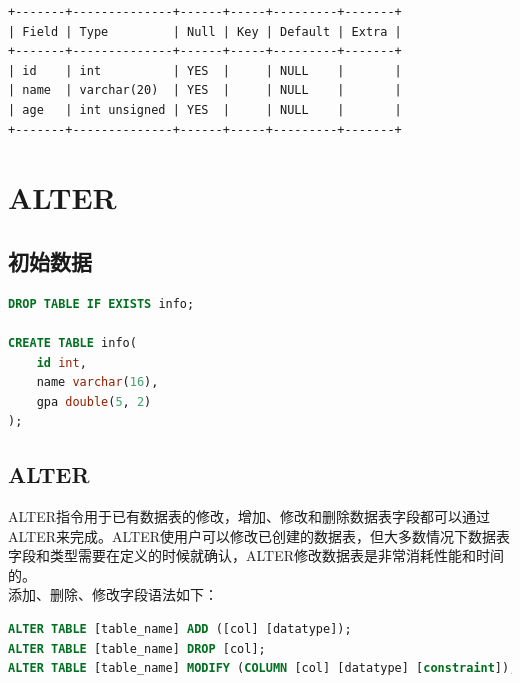 \documentclass[12pt, openany, oneside]{book}
\begin{document}
\begin{tcolorbox}
    \begin{verbatim}
+-------+--------------+------+-----+---------+-------+
| Field | Type         | Null | Key | Default | Extra |
+-------+--------------+------+-----+---------+-------+
| id    | int          | YES  |     | NULL    |       |
| name  | varchar(20)  | YES  |     | NULL    |       |
| age   | int unsigned | YES  |     | NULL    |       |
+-------+--------------+------+-----+---------+-------+
    \end{verbatim}
\end{tcolorbox}

\newpage

\chapter{ALTER}

\section{初始数据}


\begin{lstlisting}[language=SQL]
DROP TABLE IF EXISTS info;

CREATE TABLE info(
    id int, 
    name varchar(16), 
    gpa double(5, 2)
);
\end{lstlisting}

\section{ALTER}

ALTER指令用于已有数据表的修改，增加、修改和删除数据表字段都可以通过ALTER来完成。ALTER使用户可以修改已创建的数据表，但大多数情况下数据表字段和类型需要在定义的时候就确认，ALTER修改数据表是非常消耗性能和时间的。 \\

添加、删除、修改字段语法如下：

\vspace{-0.5cm}

\begin{lstlisting}[language=SQL]
ALTER TABLE [table_name] ADD ([col] [datatype]);
ALTER TABLE [table_name] DROP [col];
ALTER TABLE [table_name] MODIFY (COLUMN [col] [datatype] [constraint]);
\end{lstlisting}

\vspace{0.5cm}
\end{document}
